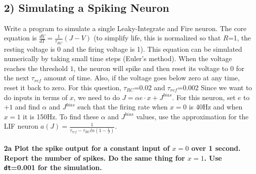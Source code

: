 \documentclass{article}
\begin{document}
    \begin{center}
    \end{center}
    { \hspace*{\fill} \\}
    
    \subsection{2) Simulating a Spiking
Neuron}\label{simulating-a-spiking-neuron}

Write a program to simulate a single Leaky-Integrate and Fire neuron.
The core equation is $\frac{dV}{dT}= \frac{1}{\tau_{RC}} (J - V)$ (to
simplify life, this is normalized so that $R$=1, the resting voltage is
0 and the firing voltage is 1). This equation can be simulated
numerically by taking small time steps (Euler's method). When the
voltage reaches the threshold $1$, the neuron will spike and then reset
its voltage to $0$ for the next $\tau_{ref}$ amount of time. Also, if
the voltage goes below zero at any time, reset it back to zero. For this
question, $\tau_{RC}$=0.02 and $\tau_{ref}$=0.002 Since we want to do
inputs in terms of $x$, we need to do $J = \alpha e \cdot x + J^{bias}$.
For this neuron, set $e$ to $+1$ and find $\alpha$ and $J^{bias}$ such
that the firing rate when $x=0$ is 40Hz and when $x=1$ it is 150Hz. To
find these $\alpha$ and $J^{bias}$ values, use the approximation for the
LIF neuron $a(J)=\frac{1} {\tau_{ref}-\tau_{RC}ln(1-\frac{1}{J})}$.

    \paragraph{2a Plot the spike output for a constant input of $x=0$ over 1
second. Report the number of spikes. Do the same thing for $x=1$. Use
\texttt{dt}=0.001 for the
simulation.}\label{a-plot-the-spike-output-for-a-constant-input-of-x0-over-1-second.-report-the-number-of-spikes.-do-the-same-thing-for-x1.-use-dt0.001-for-the-simulation.}
\end{document}
